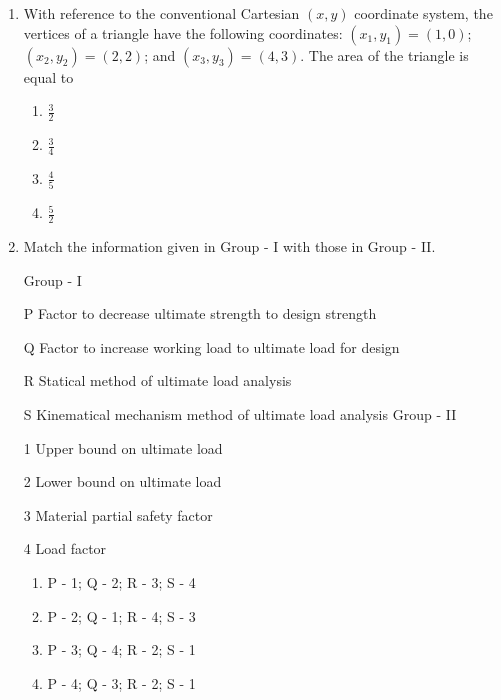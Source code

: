\documentclass[journal,12pt,onecolumn]{IEEEtran}
\theoremstyle{remark}
\begin{document}
\begin{enumerate}
\item With reference to the conventional Cartesian $(x,y)$ coordinate system, the vertices of a triangle have the following coordinates: $(x_1,y_1) = (1,0)$; $(x_2,y_2) = (2,2)$; and $(x_3,y_3) = (4,3)$. The area of the triangle is equal to \hfill{}


\begin{multicols}{4}

\begin{enumerate}
\item $\frac{3}{2}$
\item $\frac{3}{4}$
\item $\frac{4}{5}$
\item $\frac{5}{2}$
\end{enumerate}
\end{multicols}


\item Match the information given in Group - I with those in Group - II. \hfill{} \\

\begin{multicols}{2}
Group - I

P \quad Factor to decrease ultimate strength to design strength

Q \quad Factor to increase working load to ultimate load for design

R \quad Statical method of ultimate load analysis

S \quad Kinematical mechanism method of ultimate load analysis
\columnbreak
Group - II

1 \quad Upper bound on ultimate load

2 \quad Lower bound on ultimate load

3 \quad Material partial safety factor

4 \quad Load factor
\end{multicols}

\begin{multicols}{2}
\begin{enumerate}
\item P - 1; Q - 2; R - 3; S - 4
\item P - 2; Q - 1; R - 4; S - 3
\item P - 3; Q - 4; R - 2; S - 1
\item P - 4; Q - 3; R - 2; S - 1
\end{enumerate}
\end{multicols}


\end{enumerate}
\end{document}
